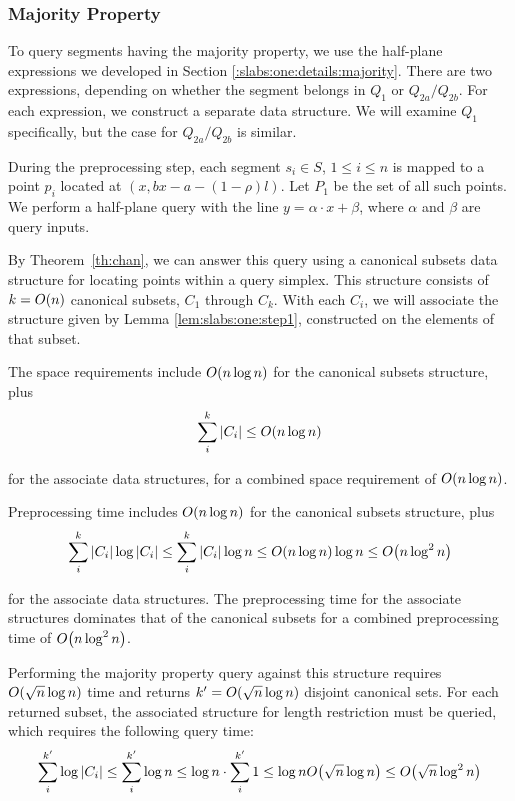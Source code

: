 \subsubsection{Majority Property}

To query segments having the majority property, we use the half-plane expressions we developed in Section \ref{:slabs:one:details:majority}.  There are two expressions, depending on whether the segment belongs in $Q_1$ or $Q_{2a}/Q_{2b}$. For each expression, we construct a separate data structure. We will examine $Q_1$ specifically, but the case for $Q_{2a}/Q_{2b}$ is similar.

During the preprocessing step, each segment $s_i \in S$, $1 \leq i \leq n$ is mapped to a point $p_i$ located at $(x, bx - a - (1 - \rho)l)$. Let $P_1$ be the set of all such points. We perform a half-plane query with the line $y = \alpha\cdot x + \beta$, where $\alpha$ and $\beta$ are query inputs.

By Theorem~\ref{th:chan}, we can answer this query using a canonical subsets data structure for locating points within a query simplex. This structure consists of $k = O\!\left(n\right)$ canonical subsets, $C_1$ through $C_k$. With each $C_i$, we will associate the structure given by Lemma \ref{lem:slabs:one:step1}, constructed on the elements of that subset.

The space requirements include $O\!\left(n \log{n}\right)$ for the canonical subsets structure, plus
\[
\sum_{i}^{k}{|C_i|} \leq O\!\left(n\log{n}\right)
\]

\noindent for the associate data structures, for a combined space requirement of $O\!\left(n\log{n}\right)$.

Preprocessing time includes $O\!\left(n\log{n}\right)$ for the canonical subsets structure, plus
\[
\sum_{i}^{k}{|C_i| \log{|C_i|}} 
\leq \sum_{i}^{k}{|C_i| \log{n}} 
\leq O\!\left(n\log{n}\right) \log{n} 
\leq O\!\left(n \log^2{n}\right)
\]

\noindent for the associate data structures. The preprocessing time for the associate structures dominates that of the canonical subsets for a combined preprocessing time of $O\!\left(n\log^2{n}\right)$.

Performing the majority property query against this structure requires $O\!\left(\sqrt{n}\log{n}\right)$ time and returns $k' = O\!\left(\sqrt{n}\log{n}\right)$ disjoint canonical sets. For each returned subset, the associated structure for length restriction must be queried, which requires the following query time:
\[
\sum_{i}^{k'}{\log{|C_i|}} 
\leq \sum_{i}^{k'}{\log{n}} 
\leq \log{n} \cdot \sum_{i}^{k'}{1}
\leq \log{n} O\!\left(\sqrt{n}\log{n}\right)
\leq O\!\left(\sqrt{n}\log^2{n}\right)
\]

